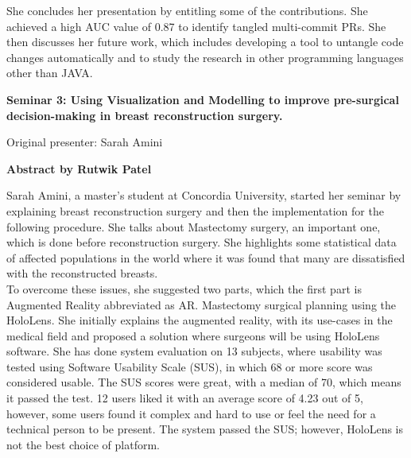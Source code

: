 \documentclass[12pt,letterpaper]{report}
\begin{document}
She concludes her presentation by entitling some of the contributions. She achieved a high AUC value of 0.87 to identify tangled multi-commit PRs. She then discusses her future work, which includes developing a tool to untangle code changes automatically and to study the research in other programming languages other than JAVA.  \\

\newpage
\begin{center}
    \textbf{Seminar 3: Using Visualization and Modelling to improve pre-surgical decision-making in breast reconstruction surgery.}
        
    \vspace{1em}
    Original presenter: Sarah Amini
       
    \vspace{2em}
    \textbf{Abstract by Rutwik Patel}
\end{center}

Sarah Amini, a master’s student at Concordia University, started her seminar by explaining breast reconstruction surgery and then the implementation for the following procedure. She talks about Mastectomy surgery, an important one, which is done before reconstruction surgery. She highlights some statistical data of affected populations in the world where it was found that many are dissatisfied with the reconstructed breasts. \\

To overcome these issues, she suggested two parts, which the first part is Augmented Reality abbreviated as AR. Mastectomy surgical planning using the HoloLens. She initially explains the augmented reality, with its use-cases in the medical field and proposed a solution where surgeons will be using HoloLens software. She has done system evaluation on 13 subjects, where usability was tested using Software Usability Scale (SUS), in which 68 or more score was considered usable. The SUS scores were great, with a median of 70, which means it passed the test. 12 users liked it with an average score of 4.23 out of 5, however, some users found it complex and hard to use or feel the need for a technical person to be present. The system passed the SUS; however, HoloLens is not the best choice of platform. \\
\end{document}
